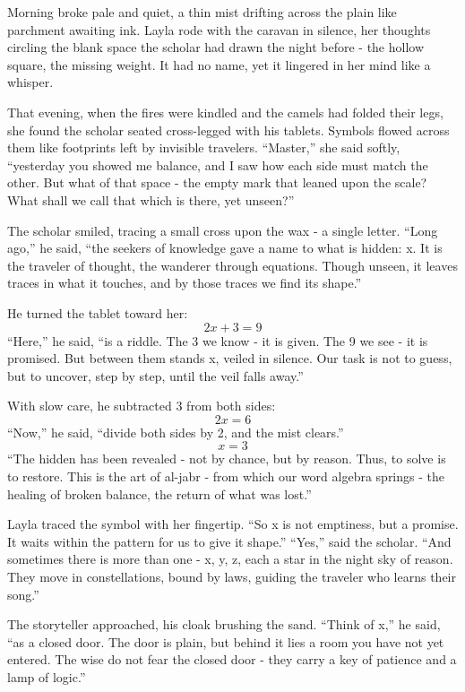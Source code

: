\documentclass[
  letterpaper,
  DIV=11,
  numbers=noendperiod]{scrreprt}
\begin{document}
Morning broke pale and quiet, a thin mist drifting across the plain like
parchment awaiting ink. Layla rode with the caravan in silence, her
thoughts circling the blank space the scholar had drawn the night before
- the hollow square, the missing weight. It had no name, yet it lingered
in her mind like a whisper.

That evening, when the fires were kindled and the camels had folded
their legs, she found the scholar seated cross-legged with his tablets.
Symbols flowed across them like footprints left by invisible travelers.
``Master,'' she said softly, ``yesterday you showed me balance, and I
saw how each side must match the other. But what of that space - the
empty mark that leaned upon the scale? What shall we call that which is
there, yet unseen?''

The scholar smiled, tracing a small cross upon the wax - a single
letter. ``Long ago,'' he said, ``the seekers of knowledge gave a name to
what is hidden: x. It is the traveler of thought, the wanderer through
equations. Though unseen, it leaves traces in what it touches, and by
those traces we find its shape.''

He turned the tablet toward her: \[
2x + 3 = 9
\] ``Here,'' he said, ``is a riddle. The 3 we know - it is given. The 9
we see - it is promised. But between them stands x, veiled in silence.
Our task is not to guess, but to uncover, step by step, until the veil
falls away.''

With slow care, he subtracted 3 from both sides: \[
2x = 6
\] ``Now,'' he said, ``divide both sides by 2, and the mist clears.'' \[
x = 3
\] ``The hidden has been revealed - not by chance, but by reason. Thus,
to solve is to restore. This is the art of al-jabr - from which our word
algebra springs - the healing of broken balance, the return of what was
lost.''

Layla traced the symbol with her fingertip. ``So x is not emptiness, but
a promise. It waits within the pattern for us to give it shape.''
``Yes,'' said the scholar. ``And sometimes there is more than one - x,
y, z, each a star in the night sky of reason. They move in
constellations, bound by laws, guiding the traveler who learns their
song.''

The storyteller approached, his cloak brushing the sand. ``Think of x,''
he said, ``as a closed door. The door is plain, but behind it lies a
room you have not yet entered. The wise do not fear the closed door -
they carry a key of patience and a lamp of logic.''
\end{document}
